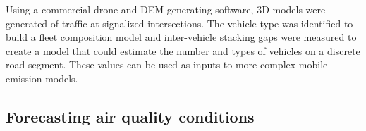Using a commercial drone and DEM generating software, 3D models were generated of traffic at signalized intersections. The vehicle type was identified to build a fleet composition model and inter-vehicle stacking gaps were measured to create a model that could estimate the number and types of vehicles on a discrete road segment. These values can be used as inputs to more complex mobile emission models.

\subsection{Forecasting air quality conditions}
